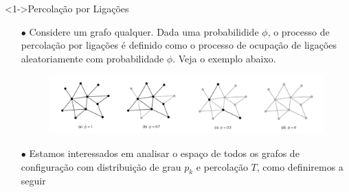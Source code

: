 \documentclass{beamer}
\begin{document}

\begin{frame}

\begin{exampleblock}
    <1->{Percolação por Ligações}

    \begin{itemize}
        \item[$\bullet$] Considere um grafo qualquer. Dada uma probabilidide $\phi$, o processo 
            de percolação por ligações é definido como o processo de ocupação de ligações 
            aleatoriamente com probabilidade $\phi$. Veja o exemplo abaixo.

            \begin{figure}
                \begin{center}
                    \includegraphics[scale=0.22]{images/grafo_branco.png}
                \end{center}
            \end{figure}
        \item[$\bullet$] Estamos interessados em analisar o espaço de todos os grafos de 
            configuração com distribuição de grau $p_k$ e percolação $T$, como definiremos
            a seguir

    \end{itemize}

\end{exampleblock}

\end{frame}

\end{document}
